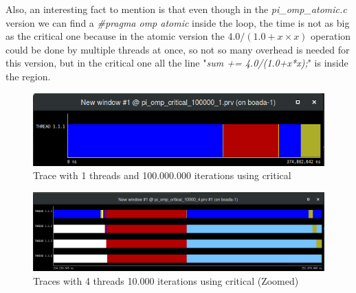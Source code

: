\documentclass[12]{article}
\begin{document}
Also, an interesting fact to mention is that even though in the \textit{pi\_omp\_atomic.c} version we can find  a \textit{\#pragma omp atomic} inside the loop, the time is not as big as the critical one because in the atomic version the $4.0/(1.0+x\times x)$ operation could be done by multiple threads at once, so not so many overhead is needed for this version, but in the critical one all the line "\textit{sum += 4.0/(1.0+x*x);}" is inside the region. 

\begin{figure}[H]
\centering
\includegraphics[scale=0.55]{images/paraverCritical1.png}
\caption{Trace with 1 threads and 100.000.000 iterations using critical}
\label{paraverCritical1}
\end{figure}


\begin{figure}[H]
\centering
\includegraphics[scale=0.35]{images/paraverCritical.png}
\caption{Traces with 4 threads 10.000 iterations using critical (Zoomed)}
\label{paraverCritical}
\end{figure}
\end{document}
